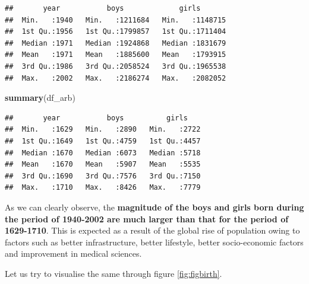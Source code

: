 \documentclass[11pt,a4paper,]{article}
\newenvironment{Shaded}{\begin{snugshade}}{\end{snugshade}}
\newcommand{\FunctionTok}[1]{\textcolor[rgb]{0.13,0.29,0.53}{\textbf{#1}}}
\newcommand{\NormalTok}[1]{#1}
\begin{document}
\begin{verbatim}
##       year           boys             girls        
##  Min.   :1940   Min.   :1211684   Min.   :1148715  
##  1st Qu.:1956   1st Qu.:1799857   1st Qu.:1711404  
##  Median :1971   Median :1924868   Median :1831679  
##  Mean   :1971   Mean   :1885600   Mean   :1793915  
##  3rd Qu.:1986   3rd Qu.:2058524   3rd Qu.:1965538  
##  Max.   :2002   Max.   :2186274   Max.   :2082052
\end{verbatim}

\begin{Shaded}
\begin{Highlighting}[]
\FunctionTok{summary}\NormalTok{(df\_arb)}
\end{Highlighting}
\end{Shaded}

\begin{verbatim}
##       year           boys          girls     
##  Min.   :1629   Min.   :2890   Min.   :2722  
##  1st Qu.:1649   1st Qu.:4759   1st Qu.:4457  
##  Median :1670   Median :6073   Median :5718  
##  Mean   :1670   Mean   :5907   Mean   :5535  
##  3rd Qu.:1690   3rd Qu.:7576   3rd Qu.:7150  
##  Max.   :1710   Max.   :8426   Max.   :7779
\end{verbatim}

\normalsize

As we can clearly observe, the \textbf{magnitude of the boys and girls born during the period of 1940-2002 are much larger than that for the period of 1629-1710}. This is expected as a result of the global rise of population owing to factors such as better infrastructure, better lifestyle, better socio-economic factors and improvement in medical sciences.

Let us try to visualise the same through figure \ref{fig:figbirth}.

\tiny
\end{document}

